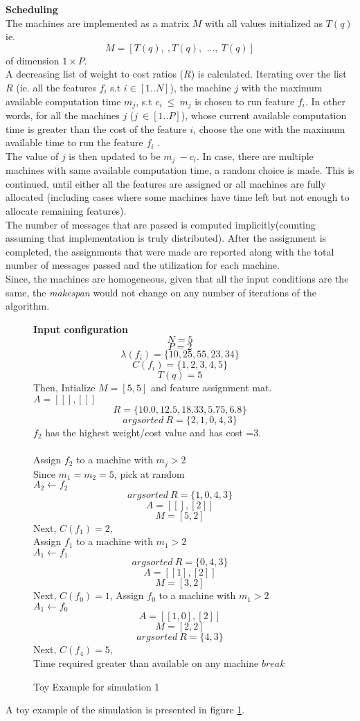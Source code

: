 \documentclass[10pt, conference, compsocconf]{IEEEtran}
\begin{document}
\textbf{Scheduling}\\
The machines are implemented as a matrix $M$ with all values initialized as $T(q)$ ie. $$M =[T(q),\ ,T(q),\, \ \dots,\ T(q)]$$ of dimension $1\times P$.\\
 A decreasing list of weight to cost ratios ($R$) is calculated. Iterating over the list $R$ (ie. all the features $f_i$ s.t $i\in[1 .. N]$), the machine $j$ with the maximum available computation time $m_j$,  s.t $c_i\ \leq\ m_j$ is chosen to run feature $f_i$. In other words, for all the machines $j$ ($j\ \in [1..P]$), whose current available computation time is greater than the cost of the feature $i$, choose the one with the maximum available time to run the feature $f_i$ . \\
The value of $j$ is then updated to be $m_j\ - c_i$. In case, there are multiple machines with same available computation time, a random choice is made. This is continued, until either all the features are assigned or all machines are fully allocated (including cases where some machines have time left but not enough to allocate remaining features).\\
The number of messages that are passed is computed implicitly(counting assuming that implementation is truly distributed). After the assignment is completed, the assignments that were made are reported along with the total number of messages passed and the utilization for each machine. \\
Since, the machines are homogeneous, given that all the input conditions are the same, the \textit{makespan} would not change on any number of iterations of the algorithm.\\
\begin{centering}
\begin{figure}[h!]
\label{fig1}
\textbf{Input configuration}
$$N =5$$
$$P=2$$
$$\lambda(f_i) =\{10,25,55,23,34\}$$
$$C(f_i)= \{1,2,3,4,5\}$$
$$T(q)=5$$
Then,
Intialize $M= [5,5]$ and feature assignment mat. $A=[[],[]]$\\
$$R =\{10.0, 12.5, 18.33, 5.75, 6.8\}$$
$$argsorted\ R= \{2,1,0,4,3\}$$
$f_2$ has the highest weight/cost value and has cost =3.\\\\
Assign $f_2$ to a machine with $m_j >2$\\
Since $m_1 =m_2=5$, pick at random\\
$A_2 \leftarrow f_2$
$$argsorted\ R= \{1,0,4,3\}$$
$$A =[[], [2]]$$
$$M =[5, 2]$$
Next, $C(f_1) =2$,\\
Assign $f_1$ to a machine with $m_1 >2$\\
$A_1 \leftarrow f_1$
$$argsorted\ R= \{0,4,3\}$$
$$A =[[1], [2]]$$
$$M =[3, 2]$$
Next, $C(f_0) =1$,
Assign $f_0$ to a machine with $m_1 >2$\\
$A_1 \leftarrow f_0$\\
$$A =[[1, 0], [2]]$$
$$M =[2, 2]$$
$$argsorted\ R= \{4,3\}$$
Next, $C(f_4) =5$,\\
Time required greater than available on any machine $break$
\caption{Toy Example for simulation 1}
\end{figure}
\end{centering}
A toy example of the simulation is presented in figure \ref{fig1}.
\end{document}

